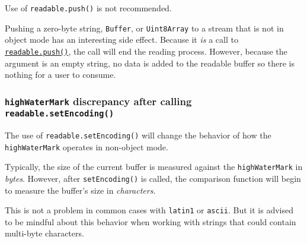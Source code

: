 Use of \texttt{readable.push(\textquotesingle{}\textquotesingle{})} is
not recommended.

Pushing a zero-byte string, \texttt{Buffer}, or \texttt{Uint8Array} to a
stream that is not in object mode has an interesting side effect.
Because it \emph{is} a call to
\hyperref[readablepushchunk-encoding]{\texttt{readable.push()}}, the
call will end the reading process. However, because the argument is an
empty string, no data is added to the readable buffer so there is
nothing for a user to consume.

\subsubsection{\texorpdfstring{\texttt{highWaterMark} discrepancy after
calling
\texttt{readable.setEncoding()}}{highWaterMark discrepancy after calling readable.setEncoding()}}\label{highwatermark-discrepancy-after-calling-readable.setencoding}

The use of \texttt{readable.setEncoding()} will change the behavior of
how the \texttt{highWaterMark} operates in non-object mode.

Typically, the size of the current buffer is measured against the
\texttt{highWaterMark} in \emph{bytes}. However, after
\texttt{setEncoding()} is called, the comparison function will begin to
measure the buffer's size in \emph{characters}.

This is not a problem in common cases with \texttt{latin1} or
\texttt{ascii}. But it is advised to be mindful about this behavior when
working with strings that could contain multi-byte characters.
